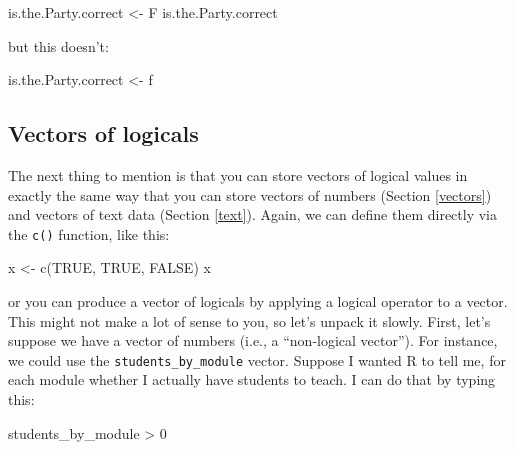 \documentclass[
]{book}
\newenvironment{Shaded}{\begin{snugshade}}{\end{snugshade}}
\newcommand{\ConstantTok}[1]{\textcolor[rgb]{0.00,0.00,0.00}{#1}}
\newcommand{\DecValTok}[1]{\textcolor[rgb]{0.00,0.00,0.81}{#1}}
\newcommand{\FunctionTok}[1]{\textcolor[rgb]{0.00,0.00,0.00}{#1}}
\newcommand{\NormalTok}[1]{#1}
\newcommand{\OtherTok}[1]{\textcolor[rgb]{0.56,0.35,0.01}{#1}}
\newcommand{\SpecialCharTok}[1]{\textcolor[rgb]{0.00,0.00,0.00}{#1}}
\begin{document}
\begin{Shaded}
\begin{Highlighting}[]
\NormalTok{is.the.Party.correct }\OtherTok{\textless{}{-}}\NormalTok{ F}
\NormalTok{is.the.Party.correct}
\end{Highlighting}
\end{Shaded}

but this doesn't:

\begin{Shaded}
\begin{Highlighting}[]
\NormalTok{is.the.Party.correct }\OtherTok{\textless{}{-}}\NormalTok{ f}
\end{Highlighting}
\end{Shaded}

\hypertarget{vectors-of-logicals}{%
\subsection{Vectors of logicals}\label{vectors-of-logicals}}

The next thing to mention is that you can store vectors of logical values in exactly the same way that you can store vectors of numbers (Section \ref{vectors}) and vectors of text data (Section \ref{text}). Again, we can define them directly via the \texttt{c()} function, like this:

\begin{Shaded}
\begin{Highlighting}[]
\NormalTok{x }\OtherTok{\textless{}{-}} \FunctionTok{c}\NormalTok{(}\ConstantTok{TRUE}\NormalTok{, }\ConstantTok{TRUE}\NormalTok{, }\ConstantTok{FALSE}\NormalTok{)}
\NormalTok{x}
\end{Highlighting}
\end{Shaded}

or you can produce a vector of logicals by applying a logical operator to a vector. This might not make a lot of sense to you, so let's unpack it slowly. First, let's suppose we have a vector of numbers (i.e., a ``non-logical vector''). For instance, we could use the \texttt{students\_by\_module} vector. Suppose I wanted R to tell me, for each module whether I actually have students to teach. I can do that by typing this:

\begin{Shaded}
\begin{Highlighting}[]
\NormalTok{students\_by\_module }\SpecialCharTok{\textgreater{}} \DecValTok{0}
\end{Highlighting}
\end{Shaded}
\end{document}
